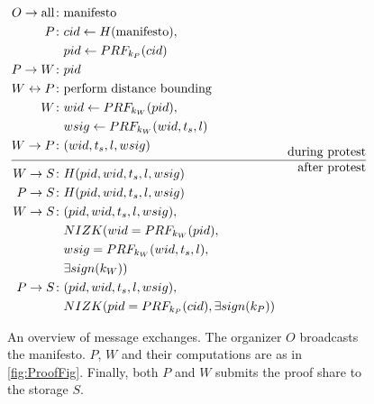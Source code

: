 \begin{columns}[t]
\begin{column}{0.32\linewidth}
    \begin{figure}
      \centering
      \begin{minipage}{\linewidth}
        \begin{align*}
          O\to \text{all}\colon & \text{manifesto} \\
          P\colon & cid\gets H(\text{manifesto}), \\
          & pid\gets PRF_{k_P}(cid) \\
          P\to W\colon & pid \\
          W\leftrightarrow P\colon & \text{perform distance bounding} \\
          W\colon & wid\gets PRF_{k_W}(pid), \\
          & wsig\gets PRF_{k_W}(wid, t_s, l) \\
          W\to P\colon & (wid, t_s, l, wsig) \\[-1em]
          && \text{during protest} \\ \hline && \text{after protest} \\[-1em]
          W\to S\colon & H(pid, wid, t_s, l, wsig) \\
          P\to S\colon & H(pid, wid, t_s, l, wsig) \\
          W\to S\colon & (pid, wid, t_s, l, wsig),\\
          & NIZK( wid = PRF_{k_W}(pid), \\
          & wsig = PRF_{k_W}(wid, t_s, l), \\
          & \exists sign(k_W)) \\
          P\to S\colon & (pid, wid, t_s, l, wsig),\\
          & NIZK(pid = PRF_{k_P}(cid), \exists sign(k_P))
        \end{align*}
      \end{minipage}
      \caption{%
        An overview of message exchanges.
        The organizer \(O\) broadcasts the manifesto.
        \(P\), \(W\) and their computations are as in \cref{fig:ProofFig}.
        Finally, both \(P\) and \(W\) submits the proof share to the storage \(S\).
      }%
      \label{Protocol}
    \end{figure}


  \end{column}

  \hfill

  \begin{column}{0.32\linewidth}


\end{column}
\end{columns}
